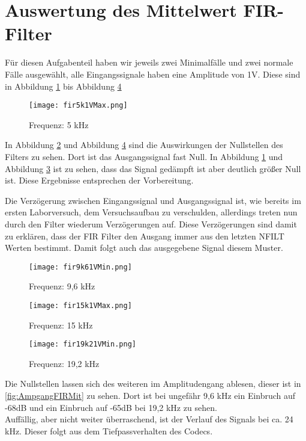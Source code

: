 \section{Auswertung des Mittelwert FIR-Filter}
F\"ur diesen Aufgabenteil haben wir jeweils zwei 
Minimalf\"alle und zwei normale F\"alle ausgew\"ahlt, alle Eingangssignale haben eine Amplitude von 1V. Diese sind in Abbildung 
\ref{fig:5k1V} bis Abbildung \ref{fig:19k21V} 
\begin{figure}[H]
  \centering
    \texttt{[image: fir5k1VMax.png]}
  \caption{Frequenz: 5 kHz}
  \label{fig:5k1V}
\end{figure}
In Abbildung \ref{fig:9k61V} und Abbildung \ref{fig:19k21V} sind die 
Auswirkungen der Nullstellen 
des Filters zu sehen. Dort ist das Ausgangssignal fast Null. In Abbildung \ref{fig:5k1V} 
und Abbildung \ref{fig:15k1V} ist zu sehen, dass das Signal ged\"ampft ist aber 
deutlich gr\"oßer Null ist.
Diese Ergebnisse entsprechen der Vorbereitung. \\\par
Die Verz\"ogerung zwischen Eingangssignal und Ausgangssignal ist, wie bereits im 
ersten Laborversuch, dem Versuchsaufbau zu verschulden, allerdings treten nun 
durch den Filter wiederum Verz\"ogerungen auf.
Diese Verz\"ogerungen sind damit zu erkl\"aren, dass der FIR Filter den Ausgang 
immer aus den letzten N\textunderscore FILT Werten bestimmt. Damit folgt auch das 
ausgegebene Signal diesem Muster.
\begin{figure}[H]
  \centering
    \texttt{[image: fir9k61VMin.png]}
  \caption{Frequenz: 9,6 kHz}
  \label{fig:9k61V}
\end{figure}
\begin{figure}[H]
  \centering
    \texttt{[image: fir15k1VMax.png]}
  \caption{Frequenz: 15 kHz}
  \label{fig:15k1V}
\end{figure}
\begin{figure}[H]
  \centering
    \texttt{[image: fir19k21VMin.png]}
  \caption{Frequenz: 19,2 kHz}
  \label{fig:19k21V}
\end{figure}\newpage
Die Nullstellen lassen sich des weiteren im Amplitudengang ablesen, dieser ist 
in \ref{fig:AmpgangFIRMit} zu sehen. Dort ist bei ungefähr 9,6 kHz ein Einbruch 
auf -68dB und ein Einbruch auf -65dB bei 19,2 kHz zu sehen.\\
Auff\"allig, aber nicht weiter \"uberraschend, ist der Verlauf des Signals bei ca. 24 kHz. 
Dieser folgt aus dem Tiefpassverhalten des Codecs.
